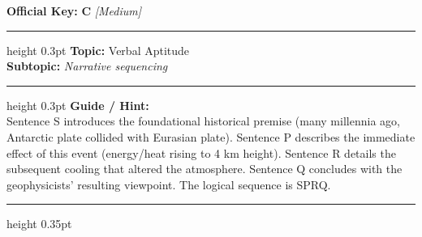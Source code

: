 \documentclass[a4paper,10pt]{article}
\begin{document}
\begin{tcolorbox}
\textbf{Official Key:} \textbf{\large C} \hfill \textit{\small [Medium]}
\vspace{2pt}\hrule height 0.3pt\vspace{3pt}
\textbf{Topic:} Verbal Aptitude \\
\textbf{Subtopic:} \textit{Narrative sequencing}
\vspace{2pt}\hrule height 0.3pt\vspace{3pt}
\textbf{Guide / Hint:} \\
{\small Sentence S introduces the foundational historical premise (many millennia ago, Antarctic plate collided with Eurasian plate). Sentence P describes the immediate effect of this event (energy/heat rising to 4 km height). Sentence R details the subsequent cooling that altered the atmosphere. Sentence Q concludes with the geophysicists' resulting viewpoint. The logical sequence is SPRQ.}

\end{tcolorbox}
\vspace{6pt}\hrule height 0.35pt\vspace{6pt}
\noindent
\end{document}
